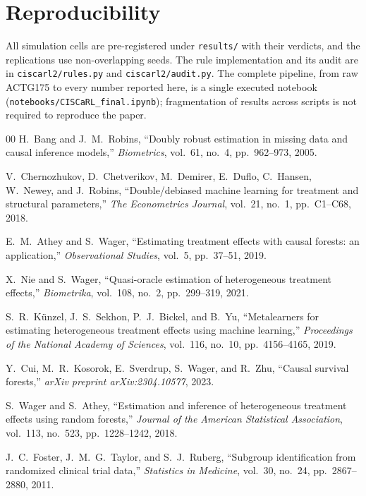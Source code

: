 \documentclass[conference]{IEEEtran}
\begin{document}
\section*{Reproducibility}

All simulation cells are pre-registered under \texttt{results/} with their
verdicts, and the replications use non-overlapping seeds. The rule
implementation and its audit are in \texttt{ciscarl2/rules.py} and
\texttt{ciscarl2/audit.py}. The complete pipeline, from raw ACTG175 to every
number reported here, is a single executed notebook
(\texttt{notebooks/CISCaRL\_final.ipynb}); fragmentation of results across
scripts is not required to reproduce the paper.

\begin{thebibliography}{00}
 H.~Bang and J.~M.~Robins, ``Doubly robust estimation in missing
data and causal inference models,'' \emph{Biometrics}, vol.~61, no.~4,
pp.~962--973, 2005.

 V.~Chernozhukov, D.~Chetverikov, M.~Demirer, E.~Duflo,
C.~Hansen, W.~Newey, and J.~Robins, ``Double/debiased machine learning for
treatment and structural parameters,'' \emph{The Econometrics Journal},
vol.~21, no.~1, pp.~C1--C68, 2018.

 E.~M.~Athey and S.~Wager, ``Estimating treatment effects
with causal forests: an application,'' \emph{Observational Studies}, vol.~5,
pp.~37--51, 2019.

 X.~Nie and S.~Wager, ``Quasi-oracle estimation of heterogeneous
treatment effects,'' \emph{Biometrika}, vol.~108, no.~2, pp.~299--319, 2021.

 S.~R.~K\"unzel, J.~S.~Sekhon, P.~J.~Bickel, and B.~Yu,
``Metalearners for estimating heterogeneous treatment effects using machine
learning,'' \emph{Proceedings of the National Academy of Sciences}, vol.~116,
no.~10, pp.~4156--4165, 2019.

 Y.~Cui, M.~R.~Kosorok, E.~Sverdrup, S.~Wager, and R.~Zhu,
``Causal survival forests,'' \emph{arXiv preprint arXiv:2304.10577}, 2023.

 S.~Wager and S.~Athey, ``Estimation and inference of
heterogeneous treatment effects using random forests,'' \emph{Journal of the
American Statistical Association}, vol.~113, no.~523, pp.~1228--1242, 2018.

 J.~C.~Foster, J.~M.~G.~Taylor, and S.~J.~Ruberg, ``Subgroup
identification from randomized clinical trial data,'' \emph{Statistics in
Medicine}, vol.~30, no.~24, pp.~2867--2880, 2011.


\end{thebibliography}
\end{document}
